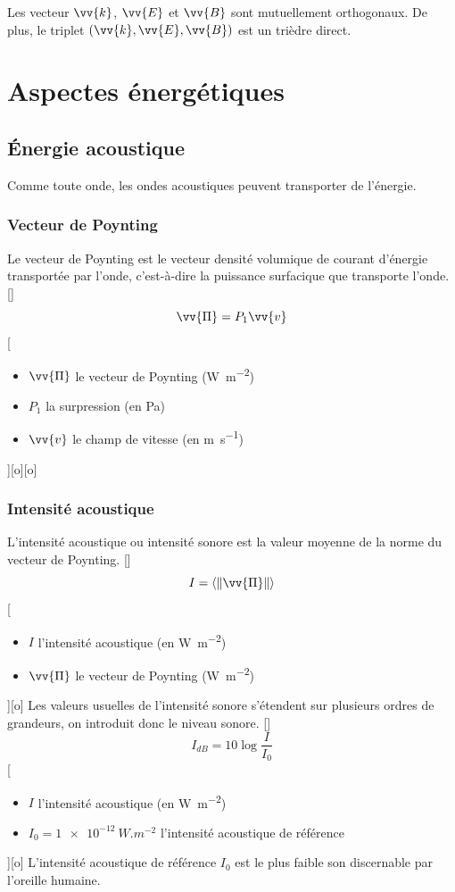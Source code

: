Les vecteur $\vv{k}$, $\vv{E}$ et $\vv{B}$ sont mutuellement orthogonaux. De plus, le triplet $(\vv{k},\vv{E},\vv{B})$ est un trièdre direct.


\section{Aspectes énergétiques}
\subsection{Énergie acoustique}
Comme toute onde, les ondes acoustiques peuvent transporter de l'énergie.
\subsubsection{Vecteur de Poynting}
Le vecteur de Poynting est le vecteur densité volumique de courant d'énergie transportée par l'onde, c'est-à-dire la puissance surfacique que transporte l'onde.
[]
{
    $$\vv{\Pi}=P_1\vv{v}$$
}
[
    \begin{itemize}
        \item $\vv{\Pi}$ le vecteur de Poynting (\unit{W.m^{-2}})
        \item $P_1$ la surpression (en \unit{Pa})
        \item $\vv{v}$ le champ de vitesse (en \unit{m.s^{-1}})
    \end{itemize}
][o][o]

\subsubsection{Intensité acoustique}
L'intensité acoustique ou intensité sonore est la valeur moyenne de la norme du vecteur de Poynting.
[]
{
    $$I=\left<\|\vv{\Pi}\|\right>$$
}
[
    \begin{itemize}
        \item $I$ l'intensité acoustique (en \unit{W.m^{-2}})
        \item $\vv{\Pi}$ le vecteur de Poynting (\unit{W.m^{-2}})
    \end{itemize}
][o]
Les valeurs usuelles de l'intensité sonore s'étendent sur plusieurs ordres de grandeurs, on introduit donc le niveau sonore.
[]
{
    $$I_{dB}=10\log{\frac{I}{I_0}}$$
}
[
    \begin{itemize}
        \item $I$ l'intensité acoustique (en \unit{W.m^{-2}})
        \item $I_0=\SI{1e-12}{W.m^{-2}}$ l'intensité acoustique de référence
    \end{itemize}
][o]
L'intensité acoustique de référence $I_0$ est le plus faible son discernable par l'oreille humaine.

